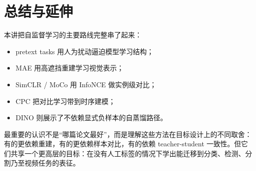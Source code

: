 \documentclass[a4paper]{article}
\begin{document}
\section{总结与延伸}
本讲把自监督学习的主要路线完整串了起来：
\begin{itemize}
\item pretext tasks 用人为扰动逼迫模型学习结构；
\item MAE 用高遮挡重建学习视觉表示；
\item SimCLR / MoCo 用 InfoNCE 做实例级对比；
\item CPC 把对比学习带到时序建模；
\item DINO 则展示了不依赖显式负样本的自蒸馏路径。
\end{itemize}

最重要的认识不是“哪篇论文最好”，而是理解这些方法在目标设计上的不同取舍：有的更依赖重建，有的更依赖样本对比，有的依赖 teacher-student 一致性。但它们共享一个更高层的目标：在没有人工标签的情况下学出能迁移到分类、检测、分割乃至视频任务的表征。
\end{document}
